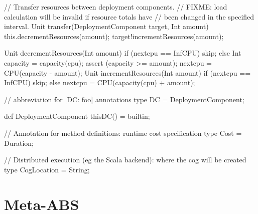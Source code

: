 \begin{abscode}
{    // Transfer resources between deployment components.
    // FIXME: load calculation will be invalid if resource totals have
    // been changed in the specified interval.
    Unit transfer(DeploymentComponent target, Int amount) {
        this.decrementResources(amount);
        target!incrementResources(amount);
    }
    
    Unit decrementResources(Int amount) {
        if (nextcpu == InfCPU)
            skip;
        else {
            Int capacity = capacity(cpu);
            assert (capacity >= amount);
            nextcpu = CPU(capacity - amount);
        }
    }
    Unit incrementResources(Int amount) {
        if (nextcpu == InfCPU)
            skip;
        else {
            nextcpu = CPU(capacity(cpu) + amount);
        }
    }
}

// abbreviation for [DC: foo] annotations
type DC = DeploymentComponent;

def DeploymentComponent thisDC() = builtin;

// Annotation for method definitions: runtime cost specification
type Cost = Duration;

// Distributed execution (eg the Scala backend): where the cog will be created
type CogLocation = String;
\end{abscode}

\section{Meta-ABS}

